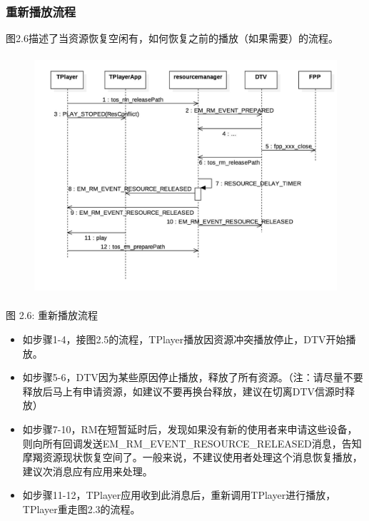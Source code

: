 \documentclass[UTF8]{ctexart}
\begin{document}
\subsubsection{重新播放流程}
图2.6描述了当资源恢复空闲有，如何恢复之前的播放（如果需要）的流程。
\begin{figure}[H]
\centering
\includegraphics[height=3.5in]{6.png}

\end{figure}
\centerline{{图 2.6: 重新播放流程}}
\begin{itemize}
\item 如步骤1-4，接图2.5的流程，TPlayer播放因资源冲突播放停止，DTV开始播放。\
\item 如步骤5-6，DTV因为某些原因停止播放，释放了所有资源。（注：请尽量不要释放后马上有申请资源，如建议不要再换台释放，建议在切离DTV信源时释放）\
\item 如步骤7-10，RM在短暂延时后，发现如果没有新的使用者来申请这些设备，则向所有回调发送EM\_RM\_EVENT\_RESOURCE\_RELEASED消息，告知摩羯资源现状恢复空间了。一般来说，不建议使用者处理这个消息恢复播放，建议次消息应有应用来处理。 \
\item 如步骤11-12，TPlayer应用收到此消息后，重新调用TPlayer进行播放，TPlayer重走图2.3的流程。\
\end{itemize}
\end{document}

